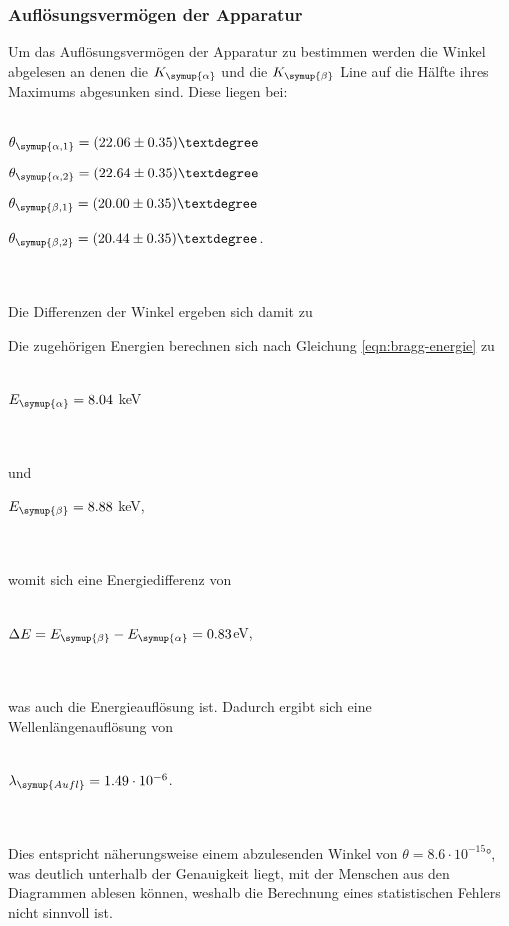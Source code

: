     \subsubsection{Auflösungsvermögen der Apparatur}
        \label{sec:cu} 
        Um das Auflösungsvermögen der Apparatur zu bestimmen werden die Winkel abgelesen an denen die $K_{\symup{\alpha}}$ und die $K_{\symup{\beta}}$
        Line auf die Hälfte ihres Maximums abgesunken sind.
        Diese liegen bei:
        \\ \\
        \centerline{$\theta_{\symup{\alpha,1}} = (22.06 \pm 0.35)°$}
        \centerline{$\theta_{\symup{\alpha,2}} = (22.64 \pm 0.35)°$}
        \centerline{$\theta_{\symup{\beta,1}} = (20.00 \pm 0.35)°$}
        \centerline{$\theta_{\symup{\beta,2}} = (20.44 \pm 0.35)°$.}
        \\ \\
        Die Differenzen der Winkel ergeben sich damit zu
        
        Die zugehörigen Energien berechnen sich nach Gleichung \eqref{eqn:bragg-energie} zu
        \\ \\
        \centerline{$E_{\symup{\alpha}} = 8.04$ keV}
        \\ \\
        und 
        \centerline{$E_{\symup{\beta}} = 8.88$ keV,}
        \\ \\
        womit sich eine Energiedifferenz von 
        \\ \\
        \centerline{$\Delta E = E_{\symup{\beta}} - E_{\symup{\alpha}} = 0.83$eV,}
        \\ \\
        was auch die Energieauflösung ist.
        Dadurch ergibt sich eine Wellenlängenauflösung von 
        \\ \\
        \centerline{$\lambda_{\symup{Aufl}} = 1.49 \cdot 10^{-6}$.}
        \\ \\
        Dies entspricht näherungsweise einem abzulesenden Winkel von $\theta = 8.6 \cdot 10^{-15} °$, was deutlich unterhalb der Genauigkeit
        liegt, mit der  Menschen 
        aus den Diagrammen ablesen können, weshalb die Berechnung eines statistischen Fehlers nicht sinnvoll ist.

